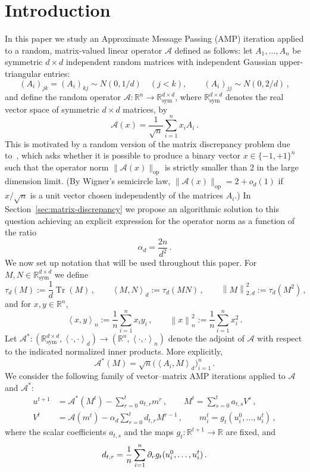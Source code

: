 \documentclass[11pt]{article}
\theoremstyle{definition}
\theoremstyle{remark}
\numberwithin{equation}{section}
\numberwithin{theorem}{section}
\newcommand{\R}{\mathbb R}
\newcommand{\Tr}{\operatorname{Tr}}
\newcommand{\op}{\mathrm{op}}
\newcommand{\ip}[2]{\left\langle #1,#2\right\rangle}
\newcommand{\norm}[1]{\left\lVert #1\right\rVert}
\newcommand{\taud}{\tau_d}
\newcommand{\cA}{\mathcal A}
\newcommand{\Symm}{\mathbb{R}^{d \times d}_{\mathrm{sym}}}
\begin{document}
\section{Introduction}
In this paper we study an Approximate Message Passing (AMP) iteration applied to a random, matrix-valued linear operator $\cA$ defined as follows:
let $A_1,\ldots,A_n$ be symmetric $d \times d$ independent random matrices with independent Gaussian upper-triangular entries:
\begin{equation}\label{eq:GOE}
  (A_i)_{jk} = (A_i)_{kj} \sim N(0,1/d)\quad (j<k),
  \qquad
  (A_i)_{jj}\sim N(0,2/d)\,,
\end{equation}
and define the random operator $\cA : \R^n \to \Symm$, where $\Symm$ denotes the real vector space of symmetric $d\times d$ matrices, by
\begin{equation}
    \cA (x) = \frac{1}{\sqrt{n}} \sum_{i=1}^n x_i A_i\,.
\end{equation}
 This is motivated by a random version of the matrix discrepancy problem due to~\cite{kunisky2023average}, which asks whether it is possible to produce a binary vector $x \in \{-1,+1\}^n$ such that the operator norm $\|\cA(x)\|_{\op}$ is strictly smaller than 2 in the large dimension limit. (By Wigner's semicircle law, $\|\cA(x)\|_{\op}=2+o_d(1)$ if $x/\sqrt{n}$ is a unit vector chosen independently of the matrices $A_i$.) In Section~\ref{sec:matrix-discrepancy} we propose an algorithmic solution to this question achieving an explicit expression for the operator norm as a function of the ratio  
\[\alpha_d =  \frac{2n}{d^2} \,.\]
%
We now set up notation that will be used throughout this paper. For $M, N \in \Symm$ we define
\[
  \taud(M):=\frac1d\Tr(M)\,,
  \qquad
  \ip{M}{N}_d:=\taud(MN)\,,
  \qquad
  \norm{M}_{2,d}^2:=\taud(M^2)\,,
\]
and for $x,y \in \R^n$,
\[
  \ip{x}{y}_n:=\frac1n\sum_{i=1}^n x_i y_i\,,
  \qquad
  \norm{x}_n^2:=\frac1n\sum_{i=1}^n x_i^2\,.
\]
Let
$\cA^* : (\Symm, \ip{\cdot}{\cdot}_d) \to (\R^n, \ip{\cdot}{\cdot}_n)$ denote the adjoint of $\cA$ with respect to the indicated normalized inner products. More explicitly,
\begin{equation}
    \cA^* (M) = \sqrt{n} \big(\ip{A_i}{M}_d\big)_{i=1}^n\,.
\end{equation}
We consider the following family of vector--matrix AMP iterations applied to $\cA$ and $\cA^*$: 
\begin{align}
  u^{t+1}&=\cA^*(M^t)- \sum_{r=0}^{t} a_{t,r} m^r\,,
  \qquad
  M^t=\sum_{s=0}^{t} a_{t,s} V^{s}\,,\label{eq:AMP0}\\
  V^t &=\cA(m^t)-\alpha_d \sum_{r=0}^t d_{t,r} M^{r-1}\,,
  \qquad
  m_i^t=g_t(u_i^0,\ldots,u_i^t)\,,\label{eq:AMP1}
\end{align}
where the scalar coefficients $a_{t,s}$ and the maps $g_t : \R^{t+1} \to \R$ are fixed, and 
\begin{equation}\label{eq:d_{rs}}
d_{t,r} = \frac{1}{n}\sum_{i=1}^n \partial_{r}g_{t}(u_i^0,\ldots,u_i^{t})\,.
\end{equation} 
\end{document}

